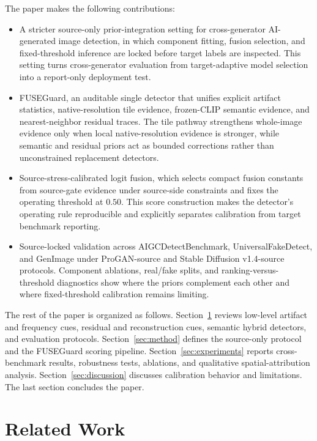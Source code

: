 \documentclass[letterpaper,journal]{IEEEtran}
\begin{document}
The paper makes the following contributions:
\begin{itemize}
    \item A stricter source-only prior-integration setting for cross-generator AI-generated image detection, in which component fitting, fusion selection, and fixed-threshold inference are locked before target labels are inspected. This setting turns cross-generator evaluation from target-adaptive model selection into a report-only deployment test.
    \item FUSEGuard, an auditable single detector that unifies explicit artifact statistics, native-resolution tile evidence, frozen-CLIP semantic evidence, and nearest-neighbor residual traces. The tile pathway strengthens whole-image evidence only when local native-resolution evidence is stronger, while semantic and residual priors act as bounded corrections rather than unconstrained replacement detectors.
    \item Source-stress-calibrated logit fusion, which selects compact fusion constants from source-gate evidence under source-side constraints and fixes the operating threshold at $0.50$. This score construction makes the detector's operating rule reproducible and explicitly separates calibration from target benchmark reporting.
    \item Source-locked validation across AIGCDetectBenchmark, UniversalFakeDetect, and GenImage under ProGAN-source and Stable Diffusion v1.4-source protocols. Component ablations, real/fake splits, and ranking-versus-threshold diagnostics show where the priors complement each other and where fixed-threshold calibration remains limiting.
\end{itemize}

The rest of the paper is organized as follows. Section~\ref{sec:related_work} reviews low-level artifact and frequency cues, residual and reconstruction cues, semantic hybrid detectors, and evaluation protocols. Section~\ref{sec:method} defines the source-only protocol and the FUSEGuard scoring pipeline. Section~\ref{sec:experiments} reports cross-benchmark results, robustness tests, ablations, and qualitative spatial-attribution analysis. Section~\ref{sec:discussion} discusses calibration behavior and limitations. The last section concludes the paper.

\section{Related Work}
\label{sec:related_work}
\end{document}
